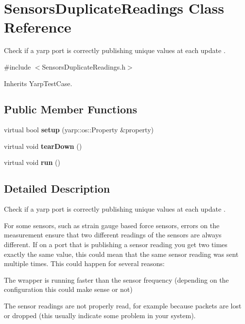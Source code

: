 \section{Sensors\+Duplicate\+Readings Class Reference}
\label{classSensorsDuplicateReadings}


Check if a yarp port is correctly publishing unique values at each update .  




{\ttfamily \#include $<$Sensors\+Duplicate\+Readings.\+h$>$}



Inherits Yarp\+Test\+Case.

\subsection*{Public Member Functions}
\begin{DoxyCompactItemize}
\item 
\label{classSensorsDuplicateReadings_ab59f0ef1631d3e9e32319d7258cfb1f8} 
virtual bool {\bfseries setup} (yarp\+::os\+::\+Property \&property)
\item 
\label{classSensorsDuplicateReadings_a985c191f7133ff39409a5d30f93316cf} 
virtual void {\bfseries tear\+Down} ()
\item 
\label{classSensorsDuplicateReadings_a4c03abe12e3dadaaa13a26a537a897e3} 
virtual void {\bfseries run} ()
\end{DoxyCompactItemize}


\subsection{Detailed Description}
Check if a yarp port is correctly publishing unique values at each update . 

For some sensors, such as strain gauge based force sensors, errors on the measurement ensure that two different readings of the sensors are always different. If on a port that is publishing a sensor reading you get two times exactly the same value, this could mean that the same sensor reading was sent multiple times. This could happen for several reasons\+:
\begin{DoxyItemize}
\item The wrapper is running faster than the sensor frequency (depending on the configuration this could make sense or not)
\item The sensor readings are not properly read, for example because packets are lost or dropped (this usually indicate some problem in your system).
\end{DoxyItemize}

